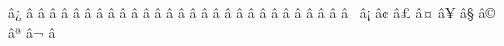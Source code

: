 \mubyte \succsim ^^e2^^89^^bf\endmubyte %
\mubyte \nprec ^^e2^^8a^^80\endmubyte %
\mubyte \nsucc ^^e2^^8a^^81\endmubyte %
\mubyte \subset ^^e2^^8a^^82\endmubyte %
\mubyte \supset ^^e2^^8a^^83\endmubyte %
\mubyte \subseteq ^^e2^^8a^^86\endmubyte %
\mubyte \supseteq ^^e2^^8a^^87\endmubyte %
\mubyte \nsubseteq ^^e2^^8a^^88\endmubyte %
\mubyte \nsupseteq ^^e2^^8a^^89\endmubyte %
\mubyte \subsetneq ^^e2^^8a^^8a\endmubyte %
\mubyte \supsetneq ^^e2^^8a^^8b\endmubyte %
\mubyte \uplus ^^e2^^8a^^8e\endmubyte %
\mubyte \sqsubset ^^e2^^8a^^8f\endmubyte %
\mubyte \sqsupset ^^e2^^8a^^90\endmubyte %
\mubyte \sqsubseteq ^^e2^^8a^^91\endmubyte %
\mubyte \sqsupseteq ^^e2^^8a^^92\endmubyte %
\mubyte \sqcap ^^e2^^8a^^93\endmubyte %
\mubyte \sqcup ^^e2^^8a^^94\endmubyte %
\mubyte \oplus ^^e2^^8a^^95\endmubyte %
\mubyte \ominus ^^e2^^8a^^96\endmubyte %
\mubyte \otimes ^^e2^^8a^^97\endmubyte %
\mubyte \oslash ^^e2^^8a^^98\endmubyte %
\mubyte \odot ^^e2^^8a^^99\endmubyte %
\mubyte \circledcirc ^^e2^^8a^^9a\endmubyte %
\mubyte \circledast ^^e2^^8a^^9b\endmubyte %
\mubyte \circleddash ^^e2^^8a^^9d\endmubyte %
\mubyte \boxplus ^^e2^^8a^^9e\endmubyte %
\mubyte \boxminus ^^e2^^8a^^9f\endmubyte %
\mubyte \boxtimes ^^e2^^8a^^a0\endmubyte %
\mubyte \boxdot ^^e2^^8a^^a1\endmubyte %
\mubyte \vdash ^^e2^^8a^^a2\endmubyte %
\mubyte \dashv ^^e2^^8a^^a3\endmubyte %
\mubyte \top ^^e2^^8a^^a4\endmubyte %
\mubyte \bot ^^e2^^8a^^a5\endmubyte %
\mubyte \models ^^e2^^8a^^a7\endmubyte %
\mubyte \Vdash ^^e2^^8a^^a9\endmubyte %
\mubyte \Vvdash ^^e2^^8a^^aa\endmubyte %
\mubyte \nvdash ^^e2^^8a^^ac\endmubyte %
\mubyte \nvDash ^^e2^^8a^^ad\endmubyte %
